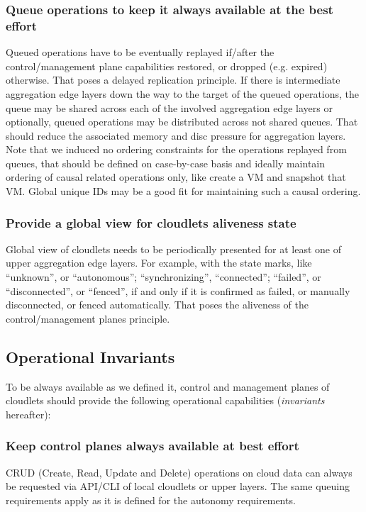 \documentclass[conference]{IEEEtran}
\begin{document}
\subsubsection{Queue operations to keep it always available at the best
effort}
Queued operations have to be eventually replayed if/after the
control/management plane capabilities restored, or dropped (e.g. expired)
otherwise. That poses a delayed replication principle. If there is intermediate
aggregation edge layers down the way to the target of the queued operations,
the queue may be shared across each of the involved aggregation edge layers or
optionally, queued operations may be distributed across not shared queues. That
should reduce the associated memory and disc pressure for aggregation layers.
Note that we induced no ordering constraints for the operations replayed from
queues, that should be defined on case-by-case basis and ideally maintain
ordering of causal related operations only, like create a VM and snapshot that
VM. Global unique IDs may be a good fit for maintaining such a causal ordering.

\subsubsection{Provide a global view for cloudlets aliveness state}
Global view of cloudlets needs to be periodically presented for at least one of
upper aggregation edge layers. For example, with
the state marks, like ``unknown'', or ``autonomous''; ``synchronizing'',
``connected''; ``failed'', or ``disconnected'', or ``fenced'', if and only if
it is confirmed as failed, or manually disconnected, or fenced automatically.
That poses the aliveness of the control/management planes principle.

\subsection{Operational Invariants}
To be always available as we defined it, control and management planes of
cloudlets should provide the following operational capabilities
(\textit{invariants} hereafter):

\subsubsection{Keep control planes always available at best effort}
CRUD (Create, Read, Update and Delete) operations on cloud data can always be
requested via API/CLI of local cloudlets or upper layers. The same queuing
requirements apply as it is defined for the autonomy requirements.
\end{document}
